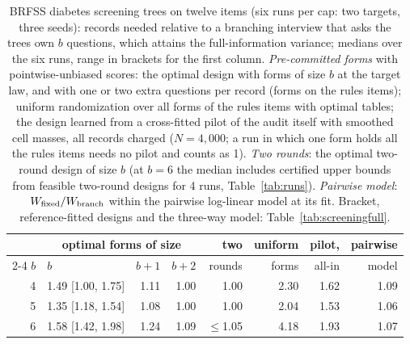 \begin{table}[t]
\centering
\caption{BRFSS diabetes screening trees on twelve items (six runs per cap: two targets, three seeds): records needed relative to a branching interview that asks the tree\textquotesingle s own $b$ questions, which attains the full-information variance; medians over the six runs, range in brackets for the first column. \emph{Pre-committed forms} with pointwise-unbiased scores: the optimal design with forms of size $b$ at the target law, and with one or two extra questions per record (forms on the rule\textquotesingle s items); uniform randomization over all forms of the rule\textquotesingle s items with optimal tables; the design learned from a cross-fitted pilot of the audit itself with smoothed cell masses, all records charged ($N=4{,}000$; a run in which one form holds all the rule\textquotesingle s items needs no pilot and counts as 1). \emph{Two rounds}: the optimal two-round design of size $b$ (at $b=6$ the median includes certified upper bounds from feasible two-round designs for 4 runs, Table~\ref{tab:runs}). \emph{Pairwise model}: $W_{\rm fixed}/W_{\rm branch}$ within the pairwise log-linear model at its fit. Bracket, reference-fitted designs and the three-way model: Table~\ref{tab:screeningfull}.}
\label{tab:screening}
\footnotesize
\setlength{\tabcolsep}{5pt}
\begin{tabular}{r l r r r r r r}
\toprule
 & \multicolumn{3}{c}{optimal forms of size} & two & uniform & pilot, & pairwise \\
\cmidrule(lr){2-4}
$b$ & $b$ & $b+1$ & $b+2$ & rounds & forms & all-in & model \\
\midrule
4 & 1.49 [1.00, 1.75] & 1.11 & 1.00 & 1.00 & 2.30 & 1.62 & 1.09 \\
5 & 1.35 [1.18, 1.54] & 1.08 & 1.00 & 1.00 & 2.04 & 1.53 & 1.06 \\
6 & 1.58 [1.42, 1.98] & 1.24 & 1.09 & $\le$1.05 & 4.18 & 1.93 & 1.07 \\
\bottomrule
\end{tabular}
\end{table}
